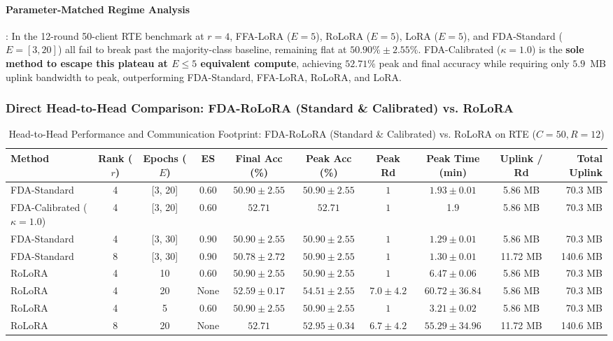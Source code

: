 \documentclass[10pt,a4paper]{article}
\begin{document}
\paragraph{Parameter-Matched Regime Analysis}:
In the 12-round 50-client RTE benchmark at $r=4$, FFA-LoRA ($E=5$), RoLoRA ($E=5$), LoRA ($E=5$), and FDA-Standard ($E=[3,20]$) all fail to break past the majority-class baseline, remaining flat at $50.90\% \pm 2.55\%$. FDA-Calibrated ($\kappa=1.0$) is the \textbf{sole method to escape this plateau at $E \le 5$ equivalent compute}, achieving $\mathbf{52.71\%}$ peak and final accuracy while requiring only $5.9$~MB uplink bandwidth to peak, outperforming FDA-Standard, FFA-LoRA, RoLoRA, and LoRA.

\subsubsection*{Direct Head-to-Head Comparison: FDA-RoLoRA (Standard \& Calibrated) vs. RoLoRA}
\begin{table}[H]
\centering
\caption{Head-to-Head Performance and Communication Footprint: FDA-RoLoRA (Standard \& Calibrated) vs. RoLoRA on RTE ($C=50, R=12$)}
\label{tab:direct_rte_c50_r12}
\scriptsize
\setlength{\tabcolsep}{1.4pt}
\begin{tabular*}{\textwidth}{@{\extracolsep{\fill}}lccccccccr@{}}
\toprule
\textbf{Method} & \textbf{Rank ($r$)} & \textbf{Epochs ($E$)} & \textbf{ES} & \textbf{Final Acc (\%)} & \textbf{Peak Acc (\%)} & \textbf{Peak Rd} & \textbf{Peak Time (min)} & \textbf{Uplink / Rd} & \textbf{Total Uplink} \\
\midrule
    FDA-Standard & 4 & [3, 20] & 0.60 & $50.90 \pm 2.55$ & $50.90 \pm 2.55$ & $1$ & $1.93 \pm 0.01$ & 5.86 MB & 70.3 MB \\
    FDA-Calibrated ($\kappa=1.0$) & 4 & [3, 20] & 0.60 & $52.71$ & $52.71$ & $1$ & 1.9 & 5.86 MB & 70.3 MB \\
    FDA-Standard & 4 & [3, 30] & 0.90 & $50.90 \pm 2.55$ & $50.90 \pm 2.55$ & $1$ & $\mathbf{1.29 \pm 0.01}$ & 5.86 MB & 70.3 MB \\
    FDA-Standard & 8 & [3, 30] & 0.90 & $50.78 \pm 2.72$ & $50.90 \pm 2.55$ & $1$ & $1.30 \pm 0.01$ & 11.72 MB & 140.6 MB \\
    RoLoRA & 4 & 10 & 0.60 & $50.90 \pm 2.55$ & $50.90 \pm 2.55$ & $1$ & $6.47 \pm 0.06$ & 5.86 MB & 70.3 MB \\
    RoLoRA & 4 & 20 & None & $52.59 \pm 0.17$ & $\mathbf{54.51 \pm 2.55}$ & $7.0 \pm 4.2$ & $60.72 \pm 36.84$ & 5.86 MB & 70.3 MB \\
    RoLoRA & 4 & 5 & 0.60 & $50.90 \pm 2.55$ & $50.90 \pm 2.55$ & $1$ & $3.21 \pm 0.02$ & 5.86 MB & 70.3 MB \\
    RoLoRA & 8 & 20 & None & $\mathbf{52.71}$ & $52.95 \pm 0.34$ & $6.7 \pm 4.2$ & $55.29 \pm 34.96$ & 11.72 MB & 140.6 MB \\
\bottomrule
\end{tabular*}
\end{table}
\end{document}
